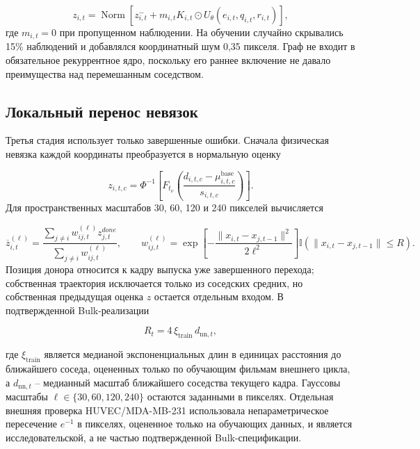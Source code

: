 \documentclass[11pt,a4paper]{article}
\begin{document}
\begin{equation}
z_{i,t}=\operatorname{Norm}
\left[
z^-_{i,t}+m_{i,t}K_{i,t}\odot
U_\theta(e_{i,t},q_{i,t},r_{i,t})
\right],
\end{equation}
где $m_{i,t}=0$ при пропущенном наблюдении. На обучении случайно скрывались 15\% наблюдений и добавлялся координатный шум 0,35 пикселя. Граф не входит в обязательное рекуррентное ядро, поскольку его раннее включение не давало преимущества над перемешанным соседством.

\subsection{Локальный перенос невязок}
Третья стадия использует только завершенные ошибки. Сначала физическая невязка каждой координаты преобразуется в нормальную оценку

\begin{equation}
z_{i,t,c}
=
\Phi^{-1}\!\left[
F_{t_\nu}\!\left(
\frac{d_{i,t,c}-\mu^{\mathrm{base}}_{i,t,c}}{s_{i,t,c}}
\right)
\right].
\end{equation}
Для пространственных масштабов 30, 60, 120 и 240 пикселей вычисляется

\begin{equation}
\overline z_{i,t}^{(\ell)}=
\frac{\sum_{j\ne i}w_{ij,t}^{(\ell)}z^{done}_{j,t}}
{\sum_{j\ne i}w_{ij,t}^{(\ell)}},
\qquad
w_{ij,t}^{(\ell)}=
\exp\left[
-\frac{\|x_{i,t}-x_{j,t-1}\|^2}{2\ell^2}
\right]
\mathbb I\!\left(\|x_{i,t}-x_{j,t-1}\|\le R\right).
\end{equation}
Позиция донора относится к кадру выпуска уже завершенного перехода; собственная траектория исключается только из соседских средних, но собственная предыдущая оценка $z$ остается отдельным входом. В подтвержденной Bulk-реализации

\begin{equation}
R_{t}=4\,\xi_{\mathrm{train}}\,d_{\mathrm{nn},t},
\end{equation}

где $\xi_{\mathrm{train}}$ является медианой экспоненциальных длин в единицах расстояния до ближайшего соседа, оцененных только по обучающим фильмам внешнего цикла, а $d_{\mathrm{nn},t}$ -- медианный масштаб ближайшего соседства текущего кадра. Гауссовы масштабы $\ell\in\{30,60,120,240\}$ остаются заданными в пикселях. Отдельная внешняя проверка HUVEC/MDA-MB-231 использовала непараметрическое пересечение $e^{-1}$ в пикселях, оцененное только на обучающих данных, и является исследовательской, а не частью подтвержденной Bulk-спецификации.
\end{document}
